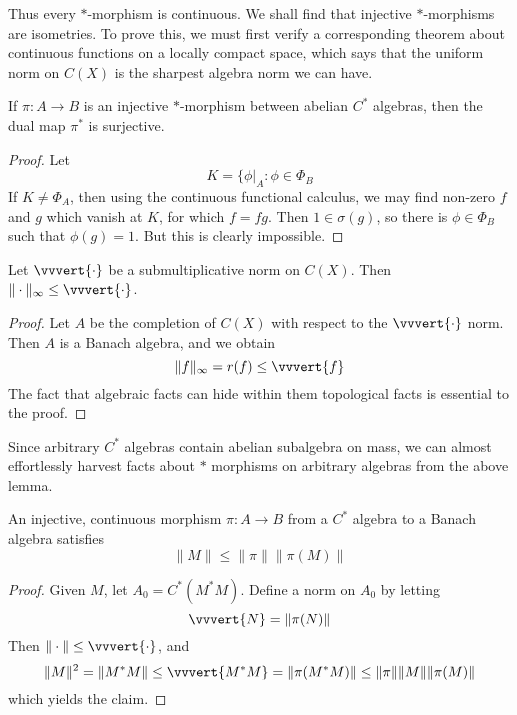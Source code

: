 Thus every $*$-morphism is continuous. We shall find that injective $*$-morphisms are isometries. To prove this, we must first verify a corresponding theorem about continuous functions on a locally compact space, which says that the uniform norm on $C(X)$ is the sharpest algebra norm we can have.

\begin{lemma}
    If $\pi: A \to B$ is an injective $*$-morphism between abelian $C^*$ algebras, then the dual map $\pi^*$ is surjective.
\end{lemma}
\begin{proof}
    Let
    \[ K = \{ \phi|_A : \phi \in \Phi_B \]
    If $K \neq \Phi_A$, then using the continuous functional calculus, we may find non-zero $f$ and $g$ which vanish at $K$, for which $f = fg$. Then $1 \in \sigma(g)$, so there is $\phi \in \Phi_B$ such that $\phi(g) = 1$. But this is clearly impossible.
\end{proof}

\begin{lemma}
    Let $\vvvert{\cdot}$ be a submultiplicative norm on $C(X)$. Then $\| \cdot \|_\infty \leq \vvvert{\cdot}$.
\end{lemma}
\begin{proof}
    Let $A$ be the completion of $C(X)$ with respect to the $\vvvert{\cdot}$ norm. Then $A$ is a Banach algebra, and we obtain
    \[ \| f \|_\infty = r(f) \leq \vvvert{f} \]
    The fact that algebraic facts can hide within them topological facts is essential to the proof.
\end{proof}

Since arbitrary $C^*$ algebras contain abelian subalgebra on mass, we can almost effortlessly harvest facts about $*$ morphisms on arbitrary algebras from the above lemma.

\begin{prop}
    An injective, continuous morphism $\pi: A \to B$ from a $C^*$ algebra to a Banach algebra satisfies
    \[ \| M \| \leq \| \pi \| \| \pi(M) \| \]
\end{prop}
\begin{proof}
    Given $M$, let $A_0 = C^*(M^*M)$. Define a norm on $A_0$ by letting
    \[ \vvvert{N} = \| \pi(N) \| \]
    Then $\| \cdot \| \leq \vvvert{\cdot}$, and
    \[ \| M \|^2 = \| M^*M \| \leq \vvvert{M^*M} = \| \pi(M^*M) \| \leq \| \pi \| \| M \| \| \pi(M) \| \]
    which yields the claim.
\end{proof}

